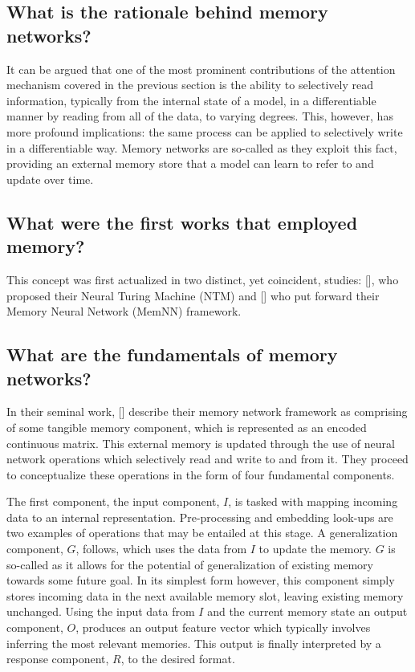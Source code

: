 \documentclass[12pt, a4paper]{report}
\theoremstyle{definition}
\theoremstyle{definition}%
\theoremstyle{definition}%
\theoremstyle{definition}%
\theoremstyle{definition}%
\theoremstyle{definition}%
\renewcommand{\cite}[1]{[\citealp{#1}]}
\begin{document}
\subsection{What is the rationale behind memory networks?}
It can be argued that one of the most prominent contributions of the attention mechanism covered in the previous section is the ability to selectively read information, typically from the internal state of a model, in a differentiable manner by reading from all of the data, to varying degrees. This, however, has more profound implications: the same process can be applied to selectively write in a differentiable way. Memory networks are so-called as they exploit this fact, providing an external memory store that a model can learn to refer to and update over time. 

\subsection{What were the first works that employed memory?}
This concept was first actualized in two distinct, yet coincident, studies: \cite{alexgraves2014}, who proposed their Neural Turing Machine (NTM) and \cite{jasonweston2014} who put forward their Memory Neural Network (MemNN) framework. 

\subsection{What are the fundamentals of memory networks?}
In their seminal work, \cite{jasonweston2014} describe their memory network framework as comprising of some tangible memory component, which is represented as an encoded continuous matrix. This external memory is updated through the use of neural network operations which selectively read and write to and from it. They proceed to conceptualize these operations in the form of four fundamental components. 

The first component, the input component, $I$, is tasked with mapping incoming data to an internal representation. Pre-processing and embedding look-ups are two examples of operations that may be entailed at this stage. A generalization component, $G$, follows, which uses the data from $I$ to update the memory. $G$ is so-called as it allows for the potential of  generalization of existing memory towards some future goal. In its simplest form however, this component simply stores incoming data in the next available memory slot, leaving existing memory unchanged. Using the input data from $I$ and the current memory state an output component, $O$, produces an output feature vector which typically involves inferring the most relevant memories. This output is finally interpreted by a response component, $R$, to the desired format. 
\end{document}
